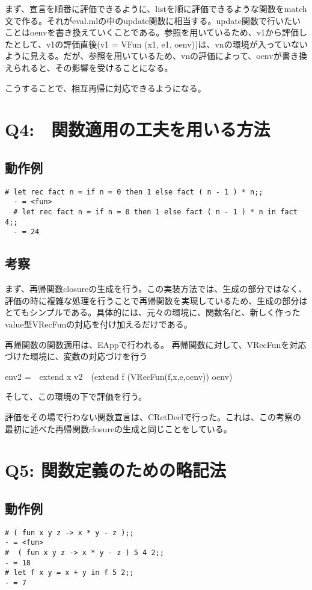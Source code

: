 \documentclass[uplatex,12pt]{jsarticle}
\begin{document}
まず、宣言を順番に評価できるように、listを順に評価できるような関数をmatch文で作る。それがeval.mlの中のupdate関数に相当する。update関数で行いたいことはoenvを書き換えていくことである。参照を用いているため、v1から評価したとして、v1の評価直後(v1 = VFun (x1, e1, oenv))は、vnの環境が入っていないように見える。だが、参照を用いているため、vnの評価によって、oenvが書き換えられると、その影響を受けることになる。

こうすることで、相互再帰に対応できるようになる。


\section{Q4:　関数適用の工夫を用いる方法}
\subsection{動作例}
\begin{lstlisting}[caption=動作例]
  # let rec fact n = if n = 0 then 1 else fact ( n - 1 ) * n;;
  - = <fun>
  # let rec fact n = if n = 0 then 1 else fact ( n - 1 ) * n in fact 4;;
  - = 24
\end{lstlisting}

\subsection{考察}
まず、再帰関数closureの生成を行う。この実装方法では、生成の部分ではなく、評価の時に複雑な処理を行うことで再帰関数を実現しているため、生成の部分はとてもシンプルである。具体的には、元々の環境に、関数名fと、新しく作ったvalue型VRecFunの対応を付け加えるだけである。

再帰関数の関数適用は、EAppで行われる。
再帰関数に対して、VRecFunを対応づけた環境に、変数の対応づけを行う

env2 =　extend x v2　(extend f (VRecFun(f,x,e,oenv)) oenv)

そして、この環境の下で評価を行う。

評価をその場で行わない関数宣言は、CRetDeclで行った。これは、この考察の最初に述べた再帰関数closureの生成と同じことをしている。

\section{Q5: 関数定義のための略記法}
\subsection{動作例}
\begin{lstlisting}[caption=動作例]
# ( fun x y z -> x * y - z );;
- = <fun>
#  ( fun x y z -> x * y - z ) 5 4 2;;
- = 18
# let f x y = x + y in f 5 2;;
- = 7
\end{lstlisting}
\end{document}
